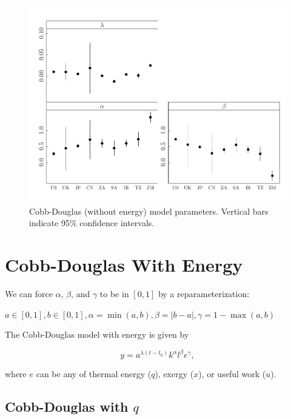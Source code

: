 \documentclass[preprint,authoryear,12pt]{elsarticle}\usepackage{graphicx, color}
\makeatletter
\def\maxwidth{ %
  \ifdim\Gin@nat@width>\linewidth
    \linewidth
  \else
    \Gin@nat@width
  \fi
}
\newenvironment{knitrout}{}{} %
\makeatother
\begin{document}
\begin{knitrout}
\color{fgcolor}\begin{figure}[]

\includegraphics[width=\maxwidth]{figure/CD_Params_Graph} \caption[Cobb-Douglas (without energy) model parameters]{Cobb-Douglas (without energy) model parameters. Vertical bars indicate 95\% confidence intervals.\label{fig:CD_Params_Graph}}
\end{figure}


\end{knitrout}


\section{Cobb-Douglas With Energy}

We can force $\alpha$, $\beta$, and $\gamma$ to be in $[0,1]$ by a reparameterization:

$a \in[0,1], b \in [0,1], \alpha=\min(a,b), \beta=|b-a|, \gamma = 1-\max(a,b)$

The Cobb-Douglas model with energy is given by

\begin{equation} \label{eq:CD_With_Energy}
  y = a^{\lambda (t-t_0)}k^{\alpha}l^{\beta}e^{\gamma},
\end{equation}

\noindent where $e$ can be any of thermal energy ($q$), exergy ($x$), or useful work ($u$).

\subsection{Cobb-Douglas with $q$}
\end{document}
